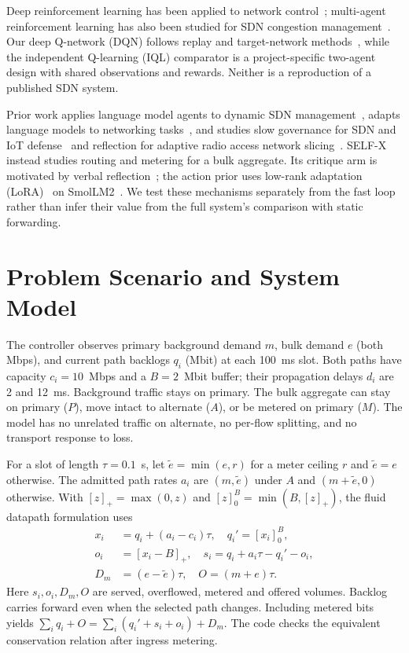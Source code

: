 \documentclass[conference]{IEEEtran}
\begin{document}
Deep reinforcement learning has been applied to network control~\cite{xu2018experience}; multi-agent reinforcement learning has also been studied for SDN congestion management~\cite{boussaoud2025marl}. Our deep Q-network (DQN) follows replay and target-network methods~\cite{mnih2015human}, while the independent Q-learning (IQL) comparator is a project-specific two-agent design with shared observations and rewards. Neither is a reproduction of a published SDN system.

Prior work applies language model agents to dynamic SDN management~\cite{araujo2024agentic}, adapts language models to networking tasks~\cite{wu2024netllm}, and studies slow governance for SDN and IoT defense~\cite{jamshidi2026governance} and reflection for adaptive radio access network slicing~\cite{li2026redsi}. SELF-X instead studies routing and metering for a bulk aggregate. Its critique arm is motivated by verbal reflection~\cite{shinn2023reflexion}; the action prior uses low-rank adaptation (LoRA)~\cite{hu2022lora} on SmolLM2~\cite{allal2025smollm2}. We test these mechanisms separately from the fast loop rather than infer their value from the full system's comparison with static forwarding.

\section{Problem Scenario and System Model}
The controller observes primary background demand \(m\), bulk demand \(e\) (both Mbps), and current path backlogs \(q_i\) (Mbit) at each 100~ms slot. Both paths have capacity \(c_i=10\)~Mbps and a \(B=2\)~Mbit buffer; their propagation delays \(d_i\) are 2 and 12~ms. Background traffic stays on primary. The bulk aggregate can stay on primary (\(P\)), move intact to alternate (\(A\)), or be metered on primary (\(M\)). The model has no unrelated traffic on alternate, no per-flow splitting, and no transport response to loss.

For a slot of length \(\tau=0.1\)~s, let \(\tilde e=\min(e,r)\) for a meter ceiling \(r\) and \(\tilde e=e\) otherwise. The admitted path rates \(a_i\) are \((m,\tilde e)\) under \(A\) and \((m+\tilde e,0)\) otherwise. With \([z]_+=\max(0,z)\) and \([z]_0^B=\min(B,[z]_+)\), the fluid datapath formulation uses
\begin{align}
x_i &= q_i+(a_i-c_i)\tau, \quad q_i'=[x_i]_0^B, \\
o_i &= [x_i-B]_+, \quad s_i=q_i+a_i\tau-q_i'-o_i,\\
D_m &= (e-\tilde e)\tau, \quad O=(m+e)\tau .
\end{align}
Here \(s_i,o_i,D_m,O\) are served, overflowed, metered and offered volumes. Backlog carries forward even when the selected path changes. Including metered bits yields \(\sum_i q_i+O=\sum_i(q_i'+s_i+o_i)+D_m\). The code checks the equivalent conservation relation after ingress metering.
\end{document}

